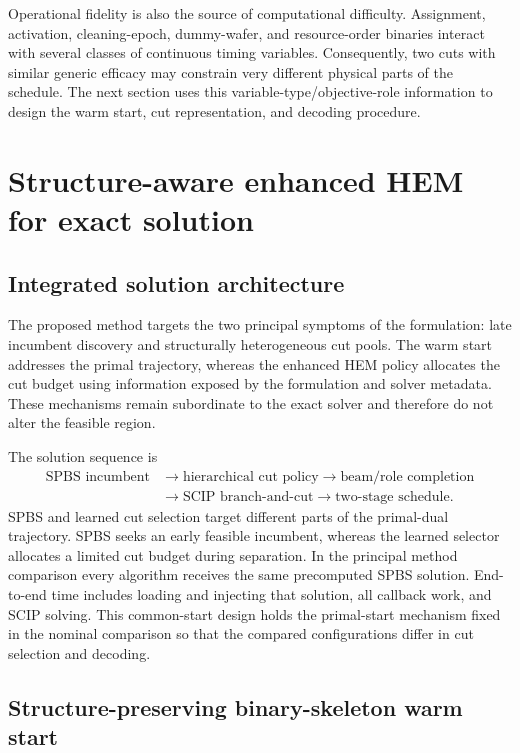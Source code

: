 \documentclass[preprint,12pt,authoryear]{elsarticle}
\begin{document}
Operational fidelity is also the source of computational difficulty.
Assignment, activation, cleaning-epoch, dummy-wafer, and resource-order binaries
interact with several classes of continuous timing variables. Consequently,
two cuts with similar generic efficacy may constrain very different physical
parts of the schedule. The next section uses this variable-type/objective-role
information to design the warm start, cut representation, and decoding
procedure.

\section{Structure-aware enhanced HEM for exact solution}
\label{sec:method}

\subsection{Integrated solution architecture}

The proposed method targets the two principal symptoms of the formulation:
late incumbent discovery and structurally heterogeneous cut pools. The warm
start addresses the primal trajectory, whereas the enhanced HEM policy
allocates the cut budget using information exposed by the formulation and
solver metadata.
These mechanisms remain subordinate to the exact solver and therefore do not
alter the feasible region.

The solution sequence is
\[
\begin{aligned}
 \text{SPBS incumbent}&\rightarrow\text{hierarchical cut policy}
 \rightarrow\text{beam/role completion}\\
 &\rightarrow\text{SCIP branch-and-cut}
 \rightarrow\text{two-stage schedule}.
\end{aligned}
\]
SPBS and learned cut selection target different parts of the primal-dual
trajectory. SPBS seeks an early feasible incumbent, whereas the learned
selector allocates a limited cut budget during separation. In the principal
method comparison every algorithm receives the same precomputed SPBS solution.
End-to-end time includes loading and injecting that solution, all callback
work, and SCIP solving. This common-start design holds the primal-start
mechanism fixed in the nominal comparison so that the compared configurations
differ in cut selection and decoding.

\subsection{Structure-preserving binary-skeleton warm start}
\end{document}
